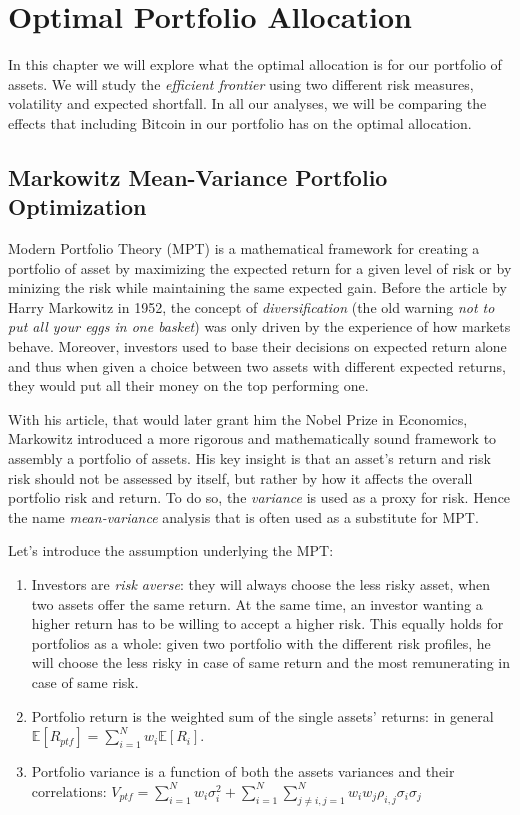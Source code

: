 \chapter{Optimal Portfolio Allocation}
\label{chpr:markowitz}

In this chapter we will explore what the optimal allocation is for our portfolio of assets. We will study the \textit{efficient frontier} using two different risk measures, volatility and expected shortfall. In all our analyses, we will be comparing the effects that including Bitcoin in our portfolio has on the optimal allocation.


\section{Markowitz Mean-Variance Portfolio Optimization}

Modern Portfolio Theory (MPT) is a mathematical framework for creating a portfolio of asset by maximizing the expected return for a given level of risk or by minizing the risk while maintaining the same expected gain. 
Before the article \cite{MARKOWITZ1952} by Harry Markowitz in 1952, the concept of \textit{diversification} (the old warning \textit{not to put all your eggs in one basket}) was only driven by the experience of how markets behave.
Moreover, investors used to base their decisions on expected return alone and thus when given a choice between two assets with different expected returns, they would put all their money on the top performing one.

With his article, that would later grant him the Nobel Prize in Economics, Markowitz introduced a more rigorous and mathematically sound framework to assembly a portfolio of assets. His key insight is that an asset's return and risk risk should not be assessed by itself, but rather by how it affects the overall portfolio risk and return.
To do so, the \textit{variance} is used as a proxy for risk. Hence the name \textit{mean-variance } analysis that is often used as a substitute for MPT.

\bigskip
Let's introduce the assumption underlying the MPT:
\begin{enumerate}
	\item Investors are \textit{risk averse}: they will always choose the less risky asset, when two assets offer the same return.  At the same time, an investor wanting a higher return has to be willing to accept a higher risk.
	This equally holds for portfolios as a whole: given two portfolio with the different risk profiles, he will choose the less risky in case of same return and the most remunerating in case of same risk.
	\item Portfolio return is the weighted sum of the single assets' returns: in general $\mathbb{E}[R_{ptf}] = \sum_{i=1}^{N} w_i \mathbb{E}[R_i]$.
	\item Portfolio variance is a function of both the assets variances and their correlations: $V_{ptf} = \sum_{i=1}^{N} w_i \sigma_i^2 + \sum_{i=1}^{N}\sum_{j\neq i , j=1}^{N} w_i w_j \rho_{i,j}\sigma_i\sigma_j$
\end{enumerate}

